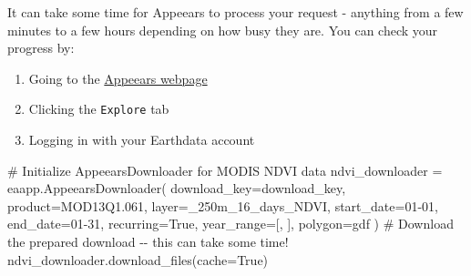 \documentclass[
  letterpaper,
  DIV=11,
  numbers=noendperiod,
  oneside]{scrreprt}
\newenvironment{Shaded}{\begin{snugshade}}{\end{snugshade}}
\newcommand{\CommentTok}[1]{\textcolor[rgb]{0.37,0.37,0.37}{#1}}
\newcommand{\NormalTok}[1]{\textcolor[rgb]{0.00,0.23,0.31}{#1}}
\newcommand{\OperatorTok}[1]{\textcolor[rgb]{0.37,0.37,0.37}{#1}}
\newcommand{\StringTok}[1]{\textcolor[rgb]{0.13,0.47,0.30}{#1}}
\newcommand{\VariableTok}[1]{\textcolor[rgb]{0.07,0.07,0.07}{#1}}
\providecommand{\tightlist}{%
  \setlength{\itemsep}{0pt}\setlength{\parskip}{0pt}}
\begin{document}
\begin{tcolorbox}[enhanced jigsaw, colbacktitle=quarto-callout-important-color!10!white, opacityback=0, bottomtitle=1mm, toptitle=1mm, bottomrule=.15mm, left=2mm, colframe=quarto-callout-important-color-frame, leftrule=.75mm, opacitybacktitle=0.6, colback=white, rightrule=.15mm, toprule=.15mm, breakable, titlerule=0mm, title=\textcolor{quarto-callout-important-color}{\faExclamation}\hspace{0.5em}{Important}, coltitle=black, arc=.35mm]

It can take some time for Appeears to process your request - anything
from a few minutes to a few hours depending on how busy they are. You
can check your progress by:

\begin{enumerate}
\def\labelenumi{\arabic{enumi}.}
\tightlist
\item
  Going to the \href{https://appeears.earthdatacloud.nasa.gov/}{Appeears
  webpage}
\item
  Clicking the \texttt{Explore} tab
\item
  Logging in with your Earthdata account
\end{enumerate}

\end{tcolorbox}

\begin{Shaded}
\begin{Highlighting}[]
\CommentTok{\# Initialize AppeearsDownloader for MODIS NDVI data}
\NormalTok{ndvi\_downloader }\OperatorTok{=}\NormalTok{ eaapp.AppeearsDownloader(}
\NormalTok{    download\_key}\OperatorTok{=}\NormalTok{download\_key,}
\NormalTok{    product}\OperatorTok{=}\StringTok{\textquotesingle{}MOD13Q1.061\textquotesingle{}}\NormalTok{,}
\NormalTok{    layer}\OperatorTok{=}\StringTok{\textquotesingle{}\_250m\_16\_days\_NDVI\textquotesingle{}}\NormalTok{,}
\NormalTok{    start\_date}\OperatorTok{=}\StringTok{\textquotesingle{}01{-}01\textquotesingle{}}\NormalTok{,}
\NormalTok{    end\_date}\OperatorTok{=}\StringTok{\textquotesingle{}01{-}31\textquotesingle{}}\NormalTok{,}
\NormalTok{    recurring}\OperatorTok{=}\VariableTok{True}\NormalTok{,}
\NormalTok{    year\_range}\OperatorTok{=}\NormalTok{[, ],}
\NormalTok{    polygon}\OperatorTok{=}\NormalTok{gdf}
\NormalTok{)}
\CommentTok{\# Download the prepared download {-}{-} this can take some time!}
\NormalTok{ndvi\_downloader.download\_files(cache}\OperatorTok{=}\VariableTok{True}\NormalTok{)}
\end{Highlighting}
\end{Shaded}
\end{document}
